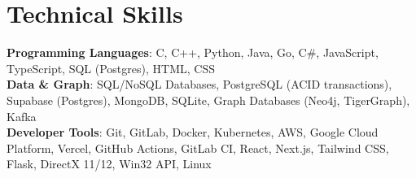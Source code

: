 \documentclass[letterpaper,11pt]{article}
\begin{document}
%
\section{Technical Skills}
 \begin{itemize}[leftmargin=0.15in, label={}]
   \small{\item{
  \textbf{Programming Languages}{: C, C++, Python, Java, Go, C\#, JavaScript, TypeScript, SQL (Postgres), HTML, CSS} \\
  \textbf{Data \& Graph}{: SQL/NoSQL Databases, PostgreSQL (ACID transactions), Supabase (Postgres), MongoDB, SQLite, Graph Databases (Neo4j, TigerGraph), Kafka} \\
  \textbf{Developer Tools}{: Git, GitLab, Docker, Kubernetes, AWS, Google Cloud Platform, Vercel, GitHub Actions, GitLab CI, React, Next.js, Tailwind CSS, Flask, DirectX 11/12, Win32 API, Linux} \\
   }}
 \end{itemize}


\end{document}
